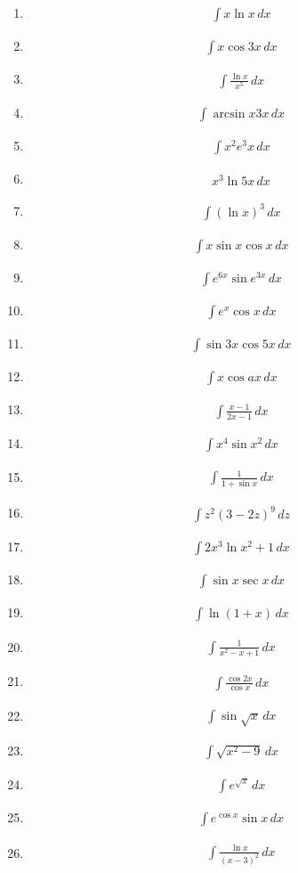 \documentclass[twoside, fleqn,12pt,letterpaper]{book}
\newcommand{\makeitem}[2]{\item {#2}\begin{align*} {#1}
  \end{align*}}
\begin{document}
\begin{multicols}{2}
\begin{enumerate}
  \makeitem{\int x\ln{x} \, dx}{\cite{Prinecton}} 
  
  \makeitem{\int x\cos{3x} \, dx }{\cite{Prinecton}}
  
  \makeitem{\int \frac{\ln{x}}{x^5} \, dx }{\cite{Prinecton}}
  
  \makeitem{\int \arcsin{x}3x \, dx}{\cite{Prinecton}} 
  
  \makeitem{\int x^2e^3x \, dx}{\cite{Prinecton}} 
  
  \makeitem{x^3\ln{5x} \, dx}{\cite{Prinecton}} 
  
  \makeitem{\int (\ln{x})^3 \, dx}{\cite{Prinecton}}
  
  \makeitem{\int x\sin{x}\cos{x} \, dx}{\cite{Prinecton}}
  
  \makeitem{\int e^{6x}\sin{e^{3x}} \, dx}{\cite{Prinecton}}
  
  \makeitem{\int e^x\cos{x} \, dx}{\cite{Prinecton}}
  
  \makeitem{\int \sin{3x}\cos{5x} \, dx}{\cite{Prinecton}} 
  
  \makeitem{\int x\cos{ax} \, dx}{\cite{Prinecton}} 
  
  \makeitem{\int \frac{x-1}{2x-1} \, dx}{\cite{Prinecton}} 
  
  \makeitem{\int x^4\sin{x^2} \, dx}{\cite{Prinecton}} 
  
  \makeitem{\int \frac{1}{1+\sin{x}} \, dx }{\cite{Prinecton}}
  
  \makeitem{\int z^2(3-2z)^9 \, dz}{\cite{Prinecton}}
  
  \makeitem{\int 2x^3\ln{x^2+1} \, dx}{\cite{Prinecton}} 
  
  \makeitem{\int \sin{x} \sec{x} \, dx}{\cite{Prinecton}}
  
  \makeitem{\int \ln{(1+x)} \, dx}{\cite{Prinecton}} 
  
  \makeitem{\int \frac{1}{x^2-x+1} \, dx}{\cite{Prinecton}} 
  
  \makeitem{\int \frac{\cos{2x}}{\cos{x}} \, dx}{\cite{Prinecton}} 
  
  \makeitem{\int \sin{\sqrt{x}} \, dx}{\cite{Prinecton}}
  
  \makeitem{\int \sqrt{x^2-9} \, dx}{\cite{Prinecton}}
  
  \makeitem{\int e^{\sqrt{x}} \, dx}{\cite{Prinecton}}
  
  \makeitem{\int e^{\cos{x}} \sin{x} \, dx}{\cite{Prinecton}}
  
  \makeitem{\int \frac{\ln{x}}{(x-3)^2} \, dx}{\cite{Prinecton}} 
  

\end{enumerate}
\end{multicols}
\end{document}
